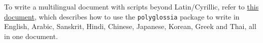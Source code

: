 To write a multilingual document with scripts beyond Latin/Cyrillic, refer to \href{https://www.overleaf.com/latex/templates/how-to-write-multilingual-text-with-different-scripts-in-latex-on-overleaf/wfdxqhcyyjxz}{this document}, which describes how to use the \texttt{polyglossia} package to write in English, Arabic, Sanskrit, Hindi, Chinese, Japanese, Korean, Greek and Thai, all in one document.
